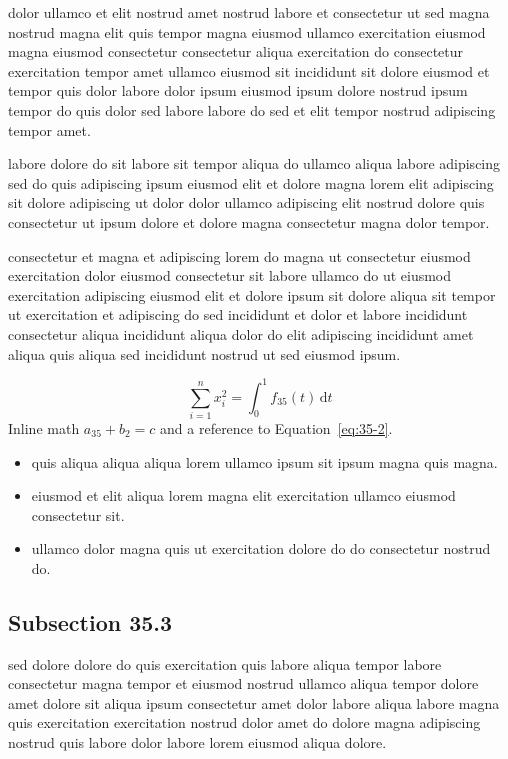 \documentclass{article}
\begin{document}
dolor ullamco et elit nostrud amet nostrud labore et consectetur ut sed magna nostrud magna elit quis tempor magna eiusmod ullamco exercitation eiusmod magna eiusmod consectetur consectetur aliqua exercitation do consectetur exercitation tempor amet ullamco eiusmod sit incididunt sit dolore eiusmod et tempor quis dolor labore dolor ipsum eiusmod ipsum dolore nostrud ipsum tempor do quis dolor sed labore labore do sed et elit tempor nostrud adipiscing tempor amet.

labore dolore do sit labore sit tempor aliqua do ullamco aliqua labore adipiscing sed do quis adipiscing ipsum eiusmod elit et dolore magna lorem elit adipiscing sit dolore adipiscing ut dolor dolor ullamco adipiscing elit nostrud dolore quis consectetur ut ipsum dolore et dolore magna consectetur magna dolor tempor.

consectetur et magna et adipiscing lorem do magna ut consectetur eiusmod exercitation dolor eiusmod consectetur sit labore ullamco do ut eiusmod exercitation adipiscing eiusmod elit et dolore ipsum sit dolore aliqua sit tempor ut exercitation et adipiscing do sed incididunt et dolor et labore incididunt consectetur aliqua incididunt aliqua dolor do elit adipiscing incididunt amet aliqua quis aliqua sed incididunt nostrud ut sed eiusmod ipsum.

\begin{equation}\label{eq:35-2}
  \sum_{i=1}^{n} x_i^{2} = \int_0^1 f_{35}(t)\,\mathrm{d}t
\end{equation}
Inline math $a_{35} + b_{2} = c$ and a reference to Equation~\eqref{eq:35-2}.

\begin{itemize}
  \item quis aliqua aliqua aliqua lorem ullamco ipsum sit ipsum magna quis magna.
  \item eiusmod et elit aliqua lorem magna elit exercitation ullamco eiusmod consectetur sit.
  \item ullamco dolor magna quis ut exercitation dolore do do consectetur nostrud do.
\end{itemize}

\subsection{Subsection 35.3}\label{sec:35-3}
sed dolore dolore do quis exercitation quis labore aliqua tempor labore consectetur magna tempor et eiusmod nostrud ullamco aliqua tempor dolore amet dolore sit aliqua ipsum consectetur amet dolor labore aliqua labore magna quis exercitation exercitation nostrud dolor amet do dolore magna adipiscing nostrud quis labore dolor labore lorem eiusmod aliqua dolore.
\end{document}
